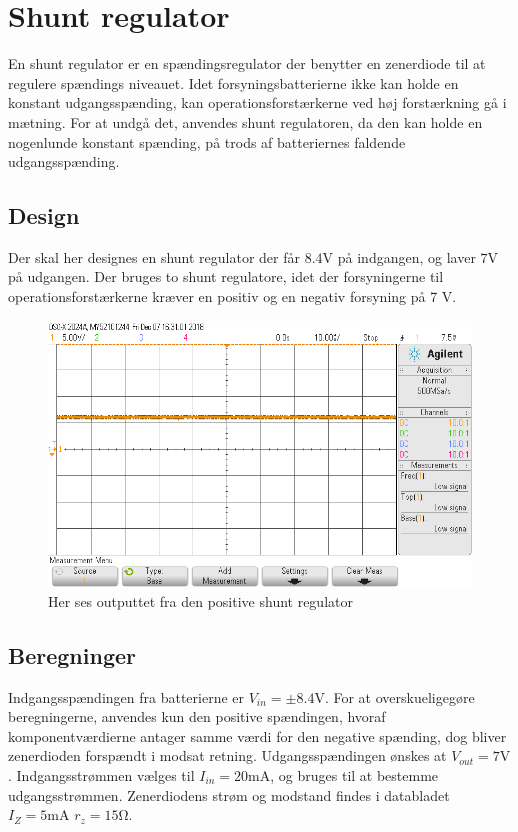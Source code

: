 \section{Shunt regulator}\label{sec:shunt}
En shunt regulator er en spændingsregulator der benytter en zenerdiode til at regulere spændings niveauet.
Idet forsyningsbatterierne ikke kan holde en konstant udgangsspænding, kan operationsforstærkerne ved høj forstærkning gå i mætning. 
For at undgå det, anvendes shunt regulatoren, da den kan holde en nogenlunde konstant spænding, på trods af batteriernes faldende udgangsspænding.

\subsection{Design}
Der skal her designes en shunt regulator der får $8.4 \si{\volt}$ på indgangen, og laver $7\si{\volt}$ på udgangen.
Der bruges to shunt regulatore, idet der forsyningerne til operationsforstærkerne kræver en positiv og en negativ forsyning på 7 \si{\volt}.
\begin{figure}[h!]
	\centering
	\includegraphics[width=1\textwidth]{billeder/shunt_pos_png.png}
	\caption{Her ses outputtet fra den positive shunt regulator}
	\label{fig:positiv_shunt}
\end{figure}
\subsection{Beregninger}
Indgangsspændingen fra batterierne er $V_{in} = \pm 8.4 \si{\volt}$. 
For at overskueligegøre beregningerne, anvendes kun den positive spændingen, hvoraf komponentværdierne antager samme værdi for den negative spænding, dog bliver zenerdioden forspændt i modsat retning.
Udgangsspændingen ønskes at $V_{out} = 7 \si{\volt}$. 
Indgangsstrømmen vælges til $I_{in} = 20\si{\milli\ampere}$, og bruges til at bestemme udgangsstrømmen.
Zenerdiodens strøm og modstand findes i databladet $I_Z = 5 \si{\milli\ampere}$ $r_z = 15 \si{\ohm}$. \cite[Side. 1 Kolonne 12]{ZenerDiode}

